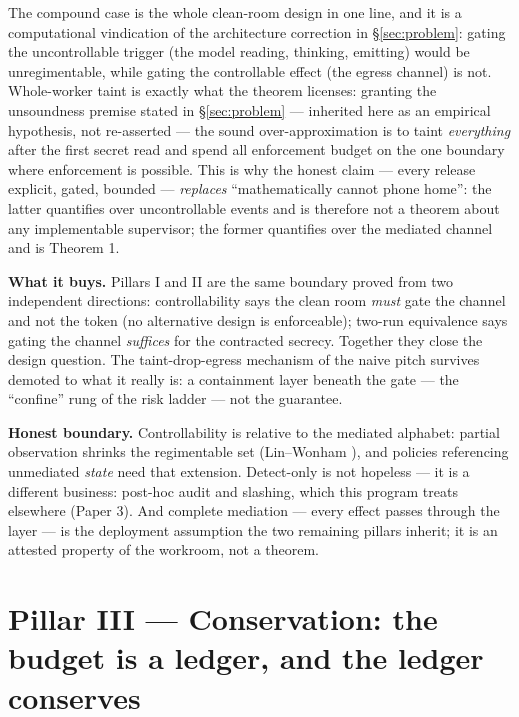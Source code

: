 \documentclass[11pt,a4paper]{article}
\begin{document}
The compound case is the whole clean-room design in one line, and it is a computational vindication of the architecture correction
in \S\ref{sec:problem}: gating the uncontrollable trigger (the model reading, thinking, emitting) would be unregimentable, while
gating the controllable effect (the egress channel) is not. Whole-worker taint is exactly what the theorem licenses: granting the unsoundness
premise stated in \S\ref{sec:problem} --- inherited here as an empirical hypothesis, not re-asserted --- the sound
over-approximation is to taint \emph{everything} after the
first secret read and spend all enforcement budget on the one boundary where enforcement is possible. This is why the honest claim
--- every release explicit, gated, bounded --- \emph{replaces} ``mathematically cannot phone home'': the latter quantifies over
uncontrollable events and is therefore not a theorem about any implementable supervisor; the former quantifies over the mediated
channel and is Theorem 1.

\textbf{What it buys.} Pillars I and II are the same boundary proved from two independent directions: controllability says the
clean room \emph{must} gate the channel and not the token (no alternative design is enforceable); two-run equivalence says gating
the channel \emph{suffices} for the contracted secrecy. Together they close the design question. The taint-drop-egress mechanism
of the naive pitch survives demoted to what it really is: a containment layer beneath the gate --- the ``confine'' rung of the
risk ladder --- not the guarantee.

\begin{boundary}
\textbf{Honest boundary.} Controllability is relative to the mediated alphabet: partial observation shrinks the regimentable set
(Lin--Wonham \cite{lin-wonham}), and policies referencing unmediated \emph{state} need that extension. Detect-only is not hopeless
--- it is a different business: post-hoc audit and slashing, which this program treats elsewhere (Paper 3). And complete mediation
--- every effect passes through the layer --- is the deployment assumption the two remaining pillars inherit; it is an attested
property of the workroom, not a theorem.
\end{boundary}

\section{Pillar III --- Conservation: the budget is a ledger, and the ledger conserves}\label{sec:p3}
\end{document}

